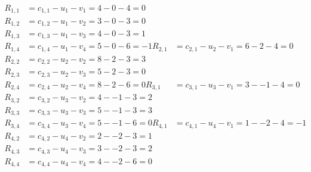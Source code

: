 \[
\begin{aligned}
R_{1,1} &= c_{1,1} - u_{1} - v_{1} = 4 - 0 - 4 = 0 \\
R_{1,2} &= c_{1,2} - u_{1} - v_{2} = 3 - 0 - 3 = 0 \\
R_{1,3} &= c_{1,3} - u_{1} - v_{3} = 4 - 0 - 3 = 1 \\
R_{1,4} &= c_{1,4} - u_{1} - v_{4} = 5 - 0 - 6 = -1 
R_{2,1} &= c_{2,1} - u_{2} - v_{1} = 6 - 2 - 4 = 0 \\
R_{2,2} &= c_{2,2} - u_{2} - v_{2} = 8 - 2 - 3 = 3 \\
R_{2,3} &= c_{2,3} - u_{2} - v_{3} = 5 - 2 - 3 = 0 \\
R_{2,4} &= c_{2,4} - u_{2} - v_{4} = 8 - 2 - 6 = 0 
R_{3,1} &= c_{3,1} - u_{3} - v_{1} = 3 - -1 - 4 = 0 \\
R_{3,2} &= c_{3,2} - u_{3} - v_{2} = 4 - -1 - 3 = 2 \\
R_{3,3} &= c_{3,3} - u_{3} - v_{3} = 5 - -1 - 3 = 3 \\
R_{3,4} &= c_{3,4} - u_{3} - v_{4} = 5 - -1 - 6 = 0 
R_{4,1} &= c_{4,1} - u_{4} - v_{1} = 1 - -2 - 4 = -1 \\
R_{4,2} &= c_{4,2} - u_{4} - v_{2} = 2 - -2 - 3 = 1 \\
R_{4,3} &= c_{4,3} - u_{4} - v_{3} = 3 - -2 - 3 = 2 \\
R_{4,4} &= c_{4,4} - u_{4} - v_{4} = 4 - -2 - 6 = 0 
\end{aligned}
\]

